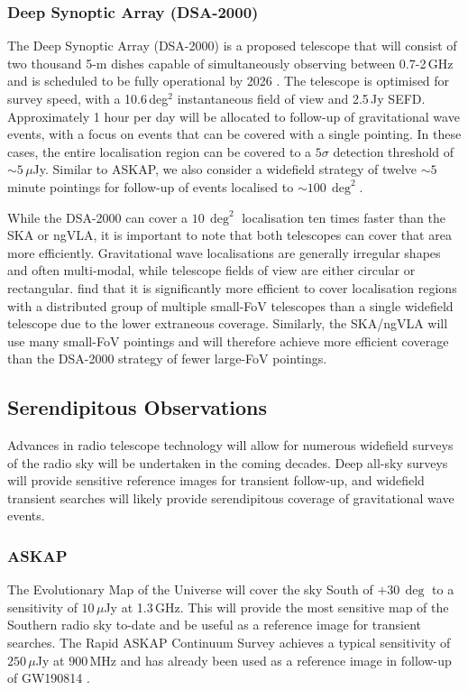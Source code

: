 \subsubsection{Deep Synoptic Array (DSA-2000)}
The Deep Synoptic Array (DSA-2000) is a proposed telescope that will consist of two thousand 5-m dishes capable of simultaneously observing between 0.7-2\,GHz and is scheduled to be fully operational by 2026 \citep{2019BAAS...51g.255H}. The telescope is optimised for survey speed, with a 10.6\,deg$^2$ instantaneous field of view and 2.5\,Jy SEFD. Approximately 1 hour per day will be allocated to follow-up of gravitational wave events, with a focus on events that can be covered with a single pointing. In these cases, the entire localisation region can be covered to a $5\sigma$ detection threshold of $\sim 5\,\mu$Jy. Similar to ASKAP, we also consider a widefield strategy of twelve $\sim 5$ minute pointings for follow-up of events localised to $\sim 100\,\deg^2$.

While the DSA-2000 can cover a $10\,\deg^2$ localisation ten times faster than the SKA or ngVLA, it is important to note that both telescopes can cover that area more efficiently. Gravitational wave localisations are generally irregular shapes and often multi-modal, while telescope fields of view are either circular or rectangular. \citet{2016A&A...592A..82G} find that it is significantly more efficient to cover localisation regions with a distributed group of multiple small-FoV telescopes than a single widefield telescope due to the lower extraneous coverage. Similarly, the SKA/ngVLA will use many small-FoV pointings and will therefore achieve more efficient coverage than the DSA-2000 strategy of fewer large-FoV pointings.

\subsection{Serendipitous Observations}
\label{subsec:serendipitous}
Advances in radio telescope technology will allow for numerous widefield surveys of the radio sky will be undertaken in the coming decades. Deep all-sky surveys will provide sensitive reference images for transient follow-up, and widefield transient searches will likely provide serendipitous coverage of gravitational wave events.

\subsubsection{ASKAP}
The Evolutionary Map of the Universe \citep[EMU;][]{2011PASA...28..215N} will cover the sky South of $+30\,\deg$ to a sensitivity of $10\,\mu$Jy at 1.3\,GHz. This will provide the most sensitive map of the Southern radio sky to-date and be useful as a reference image for transient searches. The Rapid ASKAP Continuum Survey \citep[RACS;][]{2020PASA...37...48M} achieves a typical sensitivity of $250\,\mu$Jy at $900\,$MHz and has already been used as a reference image in follow-up of GW190814 \citep{2019ApJ...887L..13D}.

